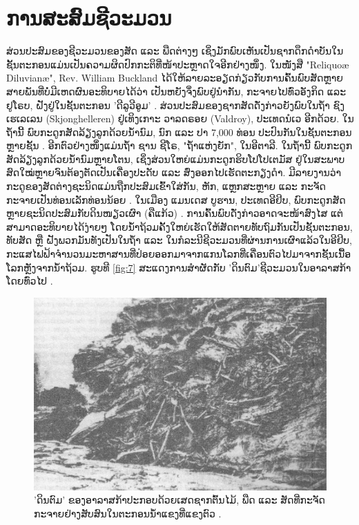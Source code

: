 \documentclass[10pt,twocolumn,letterpaper]{article}
\begin{document}
\section{ການສະສົມຊີວະມວນ}

ສ່ວນປະສົມຂອງຊີວະມວນຂອງສັດ ແລະ ພືດຕ່າງໆ ເຊິ່ງມັກພົບເຫັນເປັນຊາກດຶກດຳບັນໃນຊັ້ນຕະກອນແມ່ນເປັນຄວາມຜິດປົກກະຕິທີ່ໜ້າປະຫຼາດໃຈອີກຢ່າງໜຶ່ງ. ໃນໜັງສື "Reliquoæ Diluvianæ", Rev. William Buckland ໄດ້ໃຫ້ລາຍລະອຽດກ່ຽວກັບການຄົ້ນພົບສັດຫຼາຍສາຍພັນທີ່ບໍ່ມີເຫດຜົນອະທິບາຍໄດ້ວ່າ ເປັນຫຍັງຈຶ່ງພົບຢູ່ນຳກັນ, ກະຈາຍໄປທົ່ວອັງກິດ ແລະ ຢູໂຣບ, ຝັງຢູ່ໃນຊັ້ນຕະກອນ 'ດີລູວີອູມ' \cite{58}. ສ່ວນປະສົມຂອງຊາກສັດດັ່ງກ່າວຍັງພົບໃນຖ້ຳ ຊົງເຮເລເລນ (Skjonghelleren) ຢູ່ເທິງເກາະ ວາລດຣອຍ (Valdroy), ປະເທດນໍເວ ອີກດ້ວຍ. ໃນຖ້ຳນີ້ ພົບກະດູກສັດລ້ຽງລູກດ້ວຍນ້ຳນົມ, ນົກ ແລະ ປາ 7,000 ທ່ອນ ປະປົນກັນໃນຊັ້ນຕະກອນຫຼາຍຊັ້ນ \cite{59}. ອີກຕົວຢ່າງໜຶ່ງແມ່ນຖ້ຳ ຊານ ຊີໂຣ, "ຖ້ຳແຫ່ງຍັກ", ໃນອີຕາລີ. ໃນຖ້ຳນີ້ ພົບກະດູກສັດລ້ຽງລູກດ້ວຍນ້ຳນົມຫຼາຍໂຕນ, ເຊິ່ງສ່ວນໃຫຍ່ແມ່ນກະດູກຮິບໂປໂປເຕມັສ ຢູ່ໃນສະພາບສົດໃໝ່ຫຼາຍຈົນຕ້ອງຕັດເປັນເຄື່ອງປະດັບ ແລະ ສົ່ງອອກໄປເຮັດຕະກຽງດຳ. ມີລາຍງານວ່າ ກະດູຂອງສັດຕ່າງຊະນິດແມ່ນຖືກປະສົມເຂົ້າໃສ່ກັນ, ຫັກ, ແຫຼກສະຫຼາຍ ແລະ ກະຈັດກະຈາຍເປັນທ່ອນເລັກທ່ອນນ້ອຍ \cite{60,61}. ໃນເມືອງ ແມນເດສ ບູຮານ, ປະເທດອີຢິບ, ພົບກະດູກສັດຫຼາຍຊະນິດປະສົມກັບດິນໜຽວເຜົາ (ຄືແກ້ວ) \cite{57}.  ການຄົ້ນພົບດັ່ງກ່າວອາດຈະໜ້າສົງໄສ ແຕ່ສາມາດອະທິບາຍໄດ້ງ່າຍໆ ໂດຍນ້ຳຖ້ວມຄັ້ງໃຫຍ່ເຮັດໃຫ້ສັດຕາຍທັບຖົມກັນເປັນຊັ້ນຕະກອນ, ທັບສັດ ຫຼື ຝັງພວກມັນທັງເປັນໃນຖ້ຳ ແລະ ໃນກໍລະນີຊີວະມວນທີ່ຜ່ານການເຜົາແລ້ວໃນອີຢິບ, ກະແສໄຟຟ້າຈຳນວນມະຫາສານທີ່ປ່ອຍອອກມາຈາກແກນໂລກທີ່ເຄື່ອນຕົວໄປມາຈາກຊັ້ນເນື້ອໂລກຫຼັງຈາກນ້ຳຖ້ວມ. ຮູບທີ \ref{fig:7} ສະແດງການສຳຜັດກັບ 'ດິນຕົມ'ຊີວະມວນໃນອາລາສກ້າໂດຍທົ່ວໄປ \cite{56}.

\begin{figure}[t]
\begin{center}
   \includegraphics[width=1\linewidth]{muck-crop.jpeg}
\end{center}
   \caption{'ດິນຕົມ' ຂອງອາລາສກ້າປະກອບດ້ວຍເສດຊາກຕົ້ນໄມ້, ພືດ ແລະ ສັດທີ່ກະຈັດກະຈາຍຢ່າງສັບສົນໃນຕະກອນນ້ຳແຂງທີ່ແຂງຕົວ \cite{146}.}
\label{fig:7}
\label{fig:onecol}
\end{figure}
\end{document}
